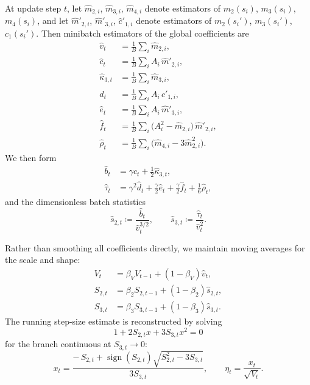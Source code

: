 \documentclass[11pt]{article}
\theoremstyle{definition}
\theoremstyle{remark}
\begin{document}
At update step $t$, let $\hat m_{2,i}$, $\hat m_{3,i}$, $\hat m_{4,i}$ denote estimators of
$m_2(s_i)$, $m_3(s_i)$, $m_4(s_i)$, and let
$\hat m'_{2,i}$, $\hat m'_{3,i}$, $\hat c'_{1,i}$ denote estimators of
$m_2(s_i')$, $m_3(s_i')$, $c_1(s_i')$.
Then minibatch estimators of the global coefficients are
\begin{align}
  \hat v_t
  &= \frac{1}{B}\sum_i \hat m_{2,i}, \\
  \hat c_t
  &= \frac{1}{B}\sum_i A_i\,\hat m'_{2,i}, \\
  \hat \kappa_{3,t}
  &= \frac{1}{B}\sum_i \hat m_{3,i}, \\
  \hat d_t
  &= \frac{1}{B}\sum_i A_i\,\hat c'_{1,i}, \\
  \hat e_t
  &= \frac{1}{B}\sum_i A_i\,\hat m'_{3,i}, \\
  \hat f_t
  &= \frac{1}{B}\sum_i \big(A_i^2 - \hat m_{2,i}\big)\,\hat m'_{2,i}, \\
  \hat \rho_t
  &= \frac{1}{B}\sum_i \big(\hat m_{4,i} - 3\hat m_{2,i}^2\big).
\end{align}
We then form
\begin{align}
  \hat b_t
  &= \gamma \hat c_t + \frac{1}{2}\hat \kappa_{3,t}, \\
  \hat \tau_t
  &= \gamma^2 \hat d_t
   + \frac{\gamma}{2}\hat e_t
   + \frac{\gamma}{2}\hat f_t
   + \frac{1}{6}\hat \rho_t,
\end{align}
and the dimensionless batch statistics
\begin{equation}
  \hat s_{2,t} \coloneqq \frac{\hat b_t}{\hat v_t^{3/2}},
  \qquad
  \hat s_{3,t} \coloneqq \frac{\hat \tau_t}{\hat v_t^2}.
\end{equation}

Rather than smoothing all coefficients directly, we maintain moving averages for the scale and shape:
\begin{align}
  V_t &= \beta_V V_{t-1} + (1-\beta_V)\hat v_t, \\
  S_{2,t} &= \beta_2 S_{2,t-1} + (1-\beta_2)\hat s_{2,t}, \\
  S_{3,t} &= \beta_3 S_{3,t-1} + (1-\beta_3)\hat s_{3,t}.
\end{align}
The running step-size estimate is reconstructed by solving
\begin{equation}
  1 + 2S_{2,t}x + 3S_{3,t}x^2 = 0
\end{equation}
for the branch continuous at $S_{3,t}\to 0$:
\begin{equation}
  x_t
  =
  \frac{
    -\,S_{2,t}
    +
    \operatorname{sign}(S_{2,t})\sqrt{S_{2,t}^2 - 3S_{3,t}}
  }{
    3S_{3,t}
  },
  \qquad
  \eta_t = \frac{x_t}{\sqrt{V_t}}.
\end{equation}
\end{document}
